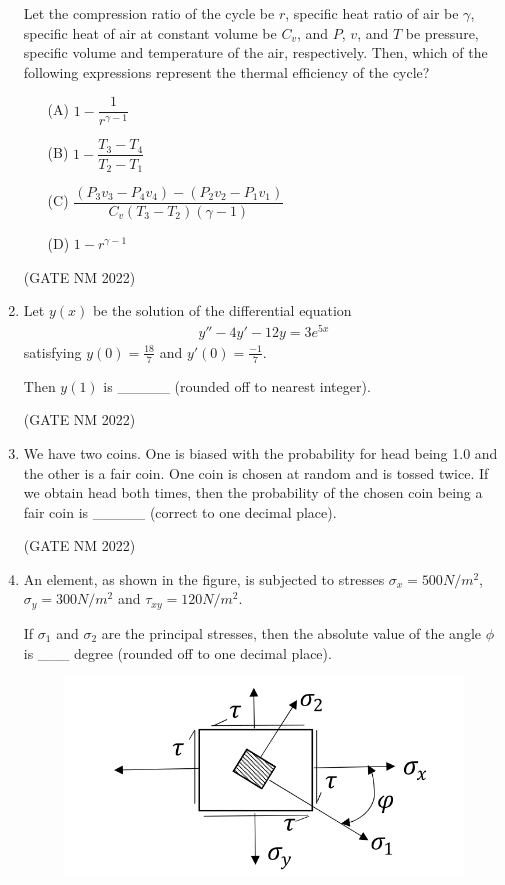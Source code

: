 \documentclass[journal,12pt,onecolumn]{IEEEtran}
\theoremstyle{remark}
\begin{document}
\begin{enumerate}
Let the compression ratio of the cycle be $r$, specific heat ratio of air be $\gamma$, specific heat of air at constant volume be $C_v$, and $P$, $v$, and $T$ be pressure, specific volume and temperature of the air, respectively.  
Then, which of the following expressions represent the thermal efficiency of the cycle?

\begin{enumerate}
    \item[(A)] $1 - \dfrac{1}{r^{\gamma - 1}}$
    \item[(B)] $1 - \dfrac{T_3 - T_4}{T_2 - T_1}$
    \item[(C)] $\dfrac{(P_3 v_3 - P_4 v_4) - (P_2 v_2 - P_1 v_1)}{C_v(T_3 - T_2)(\gamma - 1)}$
    \item[(D)] $1 - r^{\gamma - 1}$
\end{enumerate}

\hfill(GATE NM 2022)





\item  Let $y(x)$ be the solution of the differential equation  
\begin{align*}
y'' - 4y' - 12y = 3e^{5x}
\end{align*}
satisfying $y(0) = {\frac{18}{7}}$ and $y'(0) = {\frac{-1}{7}}$.  

Then $y(1)$ is \_\_\_\_\_ (rounded off to nearest integer).

\hfill(GATE NM 2022)




\item
We have two coins. One is biased with the probability for head being 1.0 and the other is a fair coin. One coin is chosen at random and is tossed twice. If we obtain head both times, then the probability of the chosen coin being a fair coin is \_\_\_\_\_  (correct to one decimal place).

\hfill(GATE NM 2022)








\item
An element, as shown in the figure, is subjected to stresses $\sigma_x = 500  N/m^2 $, $\sigma_y = 300  N/m^2 $ and $\tau_{xy} = 120  N/m^2 $.  

If $\sigma_1$ and $\sigma_2$ are the principal stresses, then the absolute value of the angle $\phi$ is \_\_\_ degree (rounded off to one decimal place).

\begin{figure}[h]
	\centering
	\includegraphics[width=0.5\columnwidth]{fig12}
	\caption{}
	\label{fig:placeholder}
\end{figure}


\end{enumerate}
\end{document}
